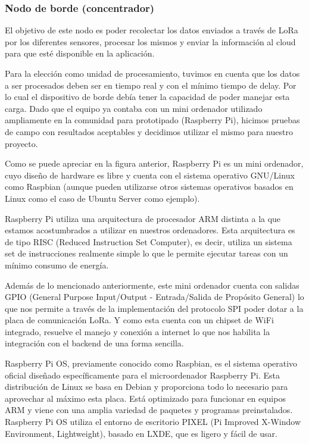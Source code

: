 \clearpage

\subsubsection{Nodo de borde (concentrador)}
El objetivo de este nodo es poder recolectar los datos enviados a través de LoRa por los diferentes sensores, procesar los mismos y enviar la información al cloud para que esté disponible en la aplicación.

Para la elección como unidad de procesamiento, tuvimos en cuenta que los datos a ser procesados deben ser en tiempo real y con el mínimo tiempo de delay. Por lo cual el dispositivo de borde debía tener la capacidad de poder manejar esta carga. Dado que el equipo ya contaba con un mini ordenador utilizado ampliamente en la comunidad para prototipado (Raspberry Pi), hicimos pruebas de campo con resultados aceptables y decidimos utilizar el mismo para nuestro proyecto.


Como se puede apreciar en la figura anterior, Raspberry Pi es un mini ordenador, cuyo diseño de hardware es libre y cuenta con el sistema operativo GNU/Linux como Raspbian (aunque pueden utilizarse otros sistemas operativos basados en Linux como el caso de Ubuntu Server como ejemplo). 


Raspberry Pi utiliza una arquitectura de procesador ARM distinta a la que estamos acostumbrados a utilizar en nuestros ordenadores. Esta arquitectura es de tipo RISC (Reduced Instruction Set Computer), es decir, utiliza un sistema set de instrucciones realmente simple lo que le permite ejecutar tareas con un mínimo consumo de energía.

Además de lo mencionado anteriormente, este mini ordenador cuenta con salidas GPIO (General Purpose Input/Output - Entrada/Salida de Propósito General) lo que nos permite a través de la implementación del protocolo SPI poder dotar a la placa de comunicación LoRa. Y como esta cuenta con un chipset de WiFi integrado, resuelve el manejo y conexión a internet lo que nos habilita la integración con el backend de una forma sencilla.


Raspberry Pi OS, previamente conocido como Raspbian, es el sistema operativo oficial diseñado específicamente para el microordenador Raspberry Pi. Esta distribución de Linux se basa en Debian y proporciona todo lo necesario para aprovechar al máximo esta placa. Está optimizado para funcionar en equipos ARM y viene con una amplia variedad de paquetes y programas preinstalados. Raspberry Pi OS utiliza el entorno de escritorio PIXEL (Pi Improved X-Window Environment, Lightweight), basado en LXDE, que es ligero y fácil de usar.

